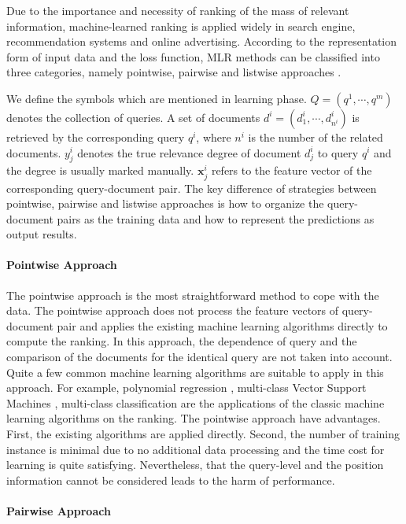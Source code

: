 Due to the importance and necessity of ranking of the mass of relevant information, machine-learned ranking is applied widely in search engine, recommendation systems and online advertising. According to the representation form of input data and the loss function, MLR methods can be classified into three categories, namely pointwise, pairwise and listwise approaches \citet{liu2009learning}. 

We define the symbols which are mentioned in learning phase. $Q=(q^1,\cdots,q^m)$ denotes the collection of queries. A set of documents $d^i=(d_1^i, \cdots, d_{n^i}^i)$ is retrieved by the corresponding query $q^i$, where $n^i$ is the number of the related documents. $y_j^i$ denotes the true relevance degree of document $d_j^i$ to query $q^i$ and the degree is usually marked manually. $\mathbf{x}_j^i$ refers to the feature vector of the corresponding query-document pair. The key difference of strategies between pointwise, pairwise and listwise approaches is how to organize the query-document pairs as the training data and how to represent the predictions as output results. 

\paragraph{Pointwise Approach}

The pointwise approach is the most straightforward method to cope with the data. The pointwise approach does not process the feature vectors of query-document pair and applies the existing machine learning algorithms directly to compute the ranking. In this approach, the dependence of query and the comparison of the documents for the identical query are not taken into account. Quite a few common machine learning algorithms are suitable to apply in this approach. For example, polynomial regression \citep{fuhr1989optimum}, multi-class Vector Support Machines \citep{crammer2001algorithmic}, multi-class classification \citep{li2007mcrank} are the applications of the classic machine learning algorithms on the ranking. The pointwise approach have advantages. First, the existing algorithms are applied directly. Second, the number of training instance is minimal due to no additional data processing and the time cost for learning is quite satisfying. Nevertheless, that the query-level and the position information cannot be considered leads to the harm of performance.

\paragraph{Pairwise Approach}

